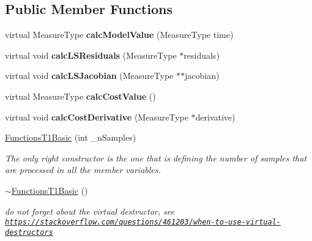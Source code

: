 \subsection*{Public Member Functions}
\begin{DoxyCompactItemize}
\item 
\mbox{\label{class_ox_1_1_functions_t1_basic_ad23b00edd74fdf78c7d21fa82bb66e6e}} 
virtual Measure\+Type {\bfseries calc\+Model\+Value} (Measure\+Type time)
\item 
\mbox{\label{class_ox_1_1_functions_t1_basic_ac9f77d95d7b39f2333b520d3a2e639e9}} 
virtual void {\bfseries calc\+L\+S\+Residuals} (Measure\+Type $\ast$residuals)
\item 
\mbox{\label{class_ox_1_1_functions_t1_basic_ac1f9d36e4a6f3459228351178e9c1296}} 
virtual void {\bfseries calc\+L\+S\+Jacobian} (Measure\+Type $\ast$$\ast$jacobian)
\item 
\mbox{\label{class_ox_1_1_functions_t1_basic_adee7b03ad49d28e5dc08a80b2c948da1}} 
virtual Measure\+Type {\bfseries calc\+Cost\+Value} ()
\item 
\mbox{\label{class_ox_1_1_functions_t1_basic_aa6a067295d09882f70eeb34b260c37b7}} 
virtual void {\bfseries calc\+Cost\+Derivative} (Measure\+Type $\ast$derivative)
\item 
\mbox{\hyperlink{class_ox_1_1_functions_t1_basic_aa7dc56ceda03a3f9b9263683ea0865e7}{Functions\+T1\+Basic}} (int \+\_\+n\+Samples)
\begin{DoxyCompactList}\small\item\em The only right constructor is the one that is defining the number of samples that are processed in all the member variables. \end{DoxyCompactList}\item 
\mbox{\label{class_ox_1_1_functions_t1_basic_a0ef373041804c4fd403b0b252bb2661c}} 
\mbox{\hyperlink{class_ox_1_1_functions_t1_basic_a0ef373041804c4fd403b0b252bb2661c}{$\sim$\+Functions\+T1\+Basic}} ()
\begin{DoxyCompactList}\small\item\em do not forget about the virtual destructor, see \href{https://stackoverflow.com/questions/461203/when-to-use-virtual-destructors}{\tt https\+://stackoverflow.\+com/questions/461203/when-\/to-\/use-\/virtual-\/destructors} \end{DoxyCompactList}\end{DoxyCompactItemize}

